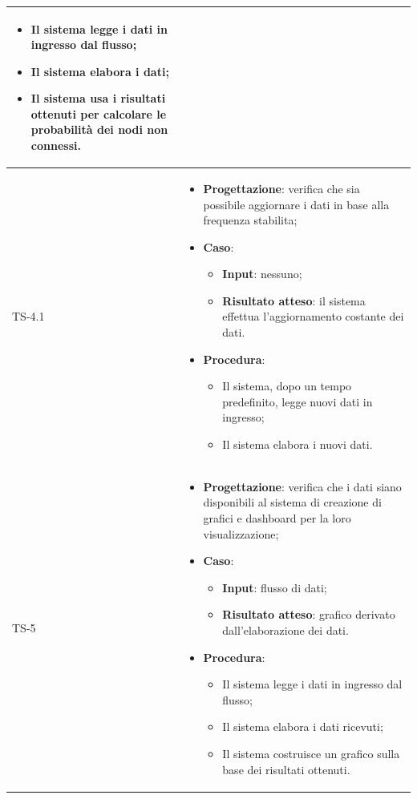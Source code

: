 \begin{longtable}{|C{2.5cm}|C{13cm}|}
\begin{itemize}
\begin{itemize}
	\item Il sistema legge i dati in ingresso dal flusso;
	\item Il sistema elabora i dati;
	\item Il sistema usa i risultati ottenuti per calcolare le probabilità dei nodi non connessi.
	\end{itemize}
\end{itemize}
	\\
	\hline
	{TS-4.1} & 
\begin{itemize}
	\item \textbf{Progettazione}: verifica che sia possibile aggiornare i dati
	in base alla frequenza stabilita;
	\item \textbf{Caso}: 
	\begin{itemize}
		\item \textbf{Input}: nessuno;
		\item \textbf{Risultato atteso}: il sistema effettua l'aggiornamento costante dei dati.
	\end{itemize}
	\item \textbf{Procedura}:
	\begin{itemize}
		\item Il sistema, dopo un tempo predefinito, legge nuovi dati in ingresso;
		\item Il sistema elabora i nuovi dati.
	\end{itemize} 
\end{itemize} \\
	\hline
	{TS-5} & 
\begin{itemize}
	\item \textbf{Progettazione}: verifica che i dati siano disponibili al sistema di
	creazione di grafici e dashboard per la loro visualizzazione;
	\item \textbf{Caso}: 
	\begin{itemize}
		\item \textbf{Input}: flusso di dati;
		\item \textbf{Risultato atteso}: grafico derivato dall'elaborazione dei dati.
	\end{itemize}
	\item \textbf{Procedura}:
	\begin{itemize}
		\item Il sistema legge i dati in ingresso dal flusso;
		\item Il sistema elabora i dati ricevuti;
		\item Il sistema costruisce un grafico sulla base dei risultati ottenuti.
	\end{itemize} 

\end{itemize}
\end{longtable}
